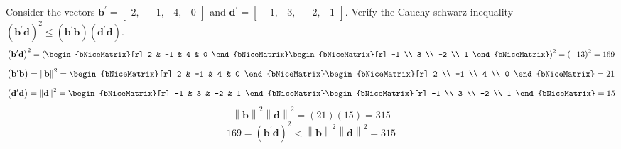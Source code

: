         Consider the vectors $\mathbf{b}^\prime = \begin{bmatrix}
            2, & -1, & 4, & 0
        \end{bmatrix}$ and $\mathbf{d}^\prime = \begin{bmatrix}
            -1, & 3, & -2, & 1
        \end{bmatrix}$. Verify the Cauchy-schwarz inequality ${\left(\mathbf{b}^\prime\mathbf{d}\right)}^2 \leq \left(\mathbf{b}^\prime\mathbf{b}\right)\left(\mathbf{d}^\prime\mathbf{d}\right)$.
        \[
            {\left(\textbf{b}^\prime\textbf{d}\right)}^2
            =
            {\left(
            \begin{bNiceMatrix}[r]
                2 & -1 & 4 & 0
            \end{bNiceMatrix}
            \begin{bNiceMatrix}[r]
                -1 \\
                3 \\
                -2 \\
                1
            \end{bNiceMatrix}
            \right)}^2
            =
            {\left(-13\right)}^2
            = 169
        \]
        \[
            {\left(\textbf{b}^\prime\textbf{b}\right)}
            = 
            {\left\|\textbf{b}\right\|}^2
            =
            \begin{bNiceMatrix}[r]
                2 & -1 & 4 & 0
            \end{bNiceMatrix}
            \begin{bNiceMatrix}[r]
                2 \\
                -1 \\
                4 \\
                0
            \end{bNiceMatrix}
            =
            21
        \]
        \[
            {\left(\textbf{d}^\prime\textbf{d}\right)}
            = 
            {\left\|\textbf{d}\right\|}^2
            =
            \begin{bNiceMatrix}[r]
                -1 & 3 & -2 & 1
            \end{bNiceMatrix}
            \begin{bNiceMatrix}[r]
                -1 \\
                3 \\
                -2 \\
                1
            \end{bNiceMatrix}
            =
            15
        \]
        \[
            {\left\|\textbf{b}\right\|}^2{\left\|\textbf{d}\right\|}^2
            =
            (21)(15) = 315
        \]
        \[
            169 = {\left(\textbf{b}^\prime\textbf{d}\right)}^2
            <
            {\left\|\textbf{b}\right\|}^2 {\left\|\textbf{d}\right\|}^2
            =
            315
        \]
